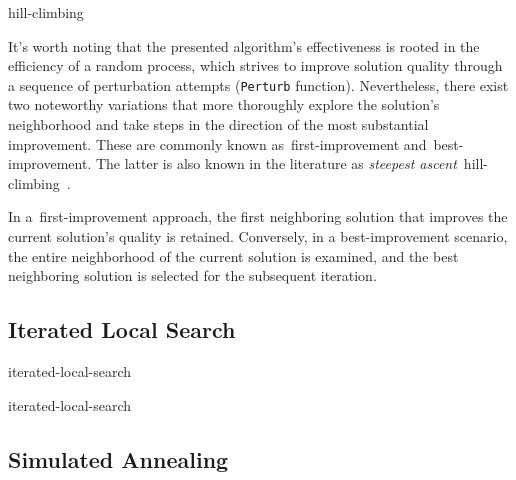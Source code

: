 \begin{algorithm}
  
  \caption{\acrlong{hill-climbing}}
  \label{algorithm:hill-climbing}
\end{algorithm}

It's worth noting that the presented algorithm's effectiveness is rooted in the
efficiency of a random process, which strives to improve solution quality
through a sequence of perturbation attempts (\texttt{Perturb} function).
Nevertheless, there exist two noteworthy variations that more thoroughly explore
the solution's neighborhood and take steps in the direction of the most
substantial improvement. These are commonly known as~\acrfull{first-improvement}
and~\acrfull{best-improvement}. The latter is also known in the literature as
\textit{steepest ascent}~\acrshort{hill-climbing}~\cite{luke2013essentialsa}.

In a~\acrshort{first-improvement} approach, the first neighboring solution that
improves the current solution's quality is retained. Conversely, in a
\acrshort{best-improvement} scenario, the entire neighborhood of the current
solution is examined, and the best neighboring solution is selected for the
subsequent iteration.

\subsection{Iterated Local Search}
\label{subsec:iterated-local-search}

\acrfull{iterated-local-search}~\cite{lourenco2010iterateda,luke2013essentialsa,blum2003metaheuristics}

% 
\begin{algorithm}
  \label{algorithm:iterated-local-search}
  \caption{\acrlong{iterated-local-search}}
  
\end{algorithm}

\subsection{Simulated Annealing}
\label{subsec:simulated-annealing}

